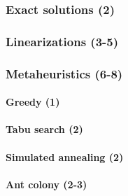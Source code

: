 \subsubsection{Exact solutions (2)}
\subsubsection{Linearizations (3-5)}

\subsubsection{Metaheuristics (6-8)}

\paragraph{Greedy (1)}
\paragraph{Tabu search (2)}
\paragraph{Simulated annealing (2)}
\paragraph{Ant colony (2-3)}

